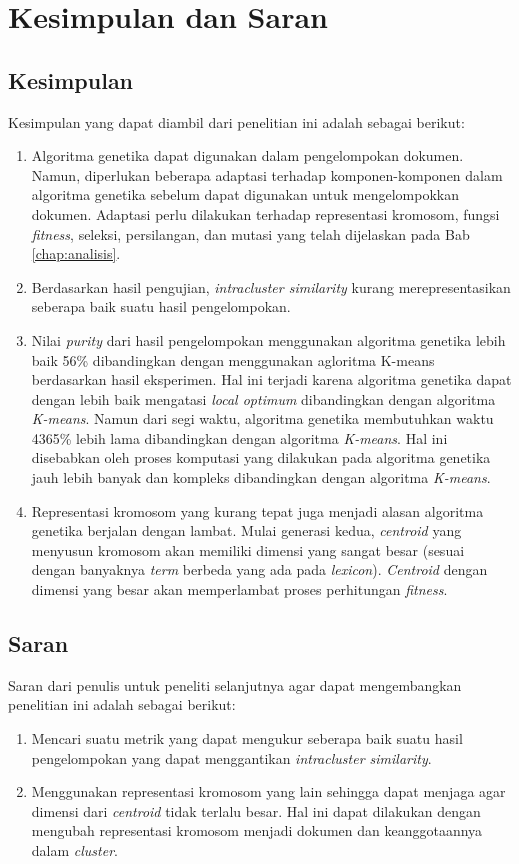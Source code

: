 \chapter{Kesimpulan dan Saran}
\label{chap:kesimpulan}

\section{Kesimpulan}
Kesimpulan yang dapat diambil dari penelitian ini adalah sebagai berikut:

\begin{enumerate}
	\item Algoritma genetika dapat digunakan dalam pengelompokan dokumen. Namun, diperlukan beberapa adaptasi terhadap komponen-komponen dalam algoritma genetika sebelum dapat digunakan untuk mengelompokkan dokumen. Adaptasi perlu dilakukan terhadap representasi kromosom, fungsi \textit{fitness}, seleksi, persilangan, dan mutasi yang telah dijelaskan pada Bab \ref{chap:analisis}.
	\item Berdasarkan hasil pengujian, \textit{intracluster similarity} kurang merepresentasikan seberapa baik suatu hasil pengelompokan. 
	\item Nilai \textit{purity} dari hasil pengelompokan menggunakan algoritma genetika lebih baik 56\% dibandingkan dengan menggunakan agloritma K-means berdasarkan hasil eksperimen. Hal ini terjadi karena algoritma genetika dapat dengan lebih baik mengatasi \textit{local optimum} dibandingkan dengan algoritma \textit{K-means}. Namun dari segi waktu, algoritma genetika membutuhkan waktu 4365\% lebih lama dibandingkan dengan algoritma \textit{K-means}. Hal ini disebabkan oleh proses komputasi yang dilakukan pada algoritma genetika jauh lebih banyak dan kompleks dibandingkan dengan algoritma \textit{K-means}.
	\item Representasi kromosom yang kurang tepat juga menjadi alasan algoritma genetika berjalan dengan lambat. Mulai generasi kedua, \textit{centroid} yang menyusun kromosom akan memiliki dimensi yang sangat besar (sesuai dengan banyaknya \textit{term} berbeda yang ada pada \textit{lexicon}). \textit{Centroid} dengan dimensi yang besar akan memperlambat proses perhitungan \textit{fitness}. 
\end{enumerate}

\section{Saran}
Saran dari penulis untuk peneliti selanjutnya agar dapat mengembangkan penelitian ini adalah sebagai berikut:

\begin{enumerate}
	\item Mencari suatu metrik yang dapat mengukur seberapa baik suatu hasil pengelompokan yang dapat menggantikan \textit{intracluster similarity}.
	\item Menggunakan representasi kromosom yang lain sehingga dapat menjaga agar dimensi dari \textit{centroid} tidak terlalu besar. Hal ini dapat dilakukan dengan mengubah representasi kromosom menjadi dokumen dan keanggotaannya dalam \textit{cluster}.
\end{enumerate}